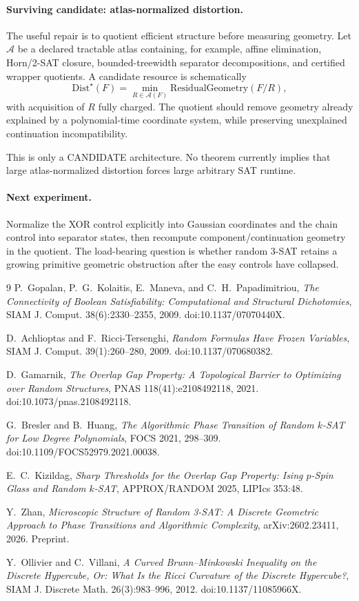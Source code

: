 \paragraph{Surviving candidate: atlas-normalized distortion.}
The useful repair is to quotient efficient structure before measuring geometry. Let
$\mathcal A$ be a declared tractable atlas containing, for example, affine elimination,
Horn/2-SAT closure, bounded-treewidth separator decompositions, and certified wrapper
quotients. A candidate resource is schematically
\[
\mathrm{Dist}^{\star}(F)
=
\min_{R\in\mathcal A(F)}
\mathrm{ResidualGeometry}(F/R),
\]
with acquisition of $R$ fully charged. The quotient should remove geometry already explained
by a polynomial-time coordinate system, while preserving unexplained continuation
incompatibility.

This is only a CANDIDATE architecture. No theorem currently implies that large
atlas-normalized distortion forces large arbitrary SAT runtime.

\paragraph{Next experiment.}
Normalize the XOR control explicitly into Gaussian coordinates and the chain control into
separator states, then recompute component/continuation geometry in the quotient. The
load-bearing question is whether random 3-SAT retains a growing primitive geometric
obstruction after the easy controls have collapsed.

\begin{thebibliography}{9}
P.~Gopalan, P.~G.~Kolaitis, E.~Maneva, and C.~H.~Papadimitriou,
\emph{The Connectivity of Boolean Satisfiability: Computational and Structural Dichotomies},
SIAM J. Comput. 38(6):2330--2355, 2009.
doi:10.1137/07070440X.

D.~Achlioptas and F.~Ricci-Tersenghi,
\emph{Random Formulas Have Frozen Variables},
SIAM J. Comput. 39(1):260--280, 2009.
doi:10.1137/070680382.

D.~Gamarnik,
\emph{The Overlap Gap Property: A Topological Barrier to Optimizing over Random Structures},
PNAS 118(41):e2108492118, 2021.
doi:10.1073/pnas.2108492118.

G.~Bresler and B.~Huang,
\emph{The Algorithmic Phase Transition of Random $k$-SAT for Low Degree Polynomials},
FOCS 2021, 298--309.
doi:10.1109/FOCS52979.2021.00038.

E.~C.~Kizildag,
\emph{Sharp Thresholds for the Overlap Gap Property: Ising $p$-Spin Glass and Random $k$-SAT},
APPROX/RANDOM 2025, LIPIcs 353:48.

Y.~Zhan,
\emph{Microscopic Structure of Random 3-SAT: A Discrete Geometric Approach to Phase Transitions and Algorithmic Complexity},
arXiv:2602.23411, 2026. Preprint.

Y.~Ollivier and C.~Villani,
\emph{A Curved Brunn--Minkowski Inequality on the Discrete Hypercube, Or: What Is the Ricci Curvature of the Discrete Hypercube?},
SIAM J. Discrete Math. 26(3):983--996, 2012.
doi:10.1137/11085966X.
\end{thebibliography}

